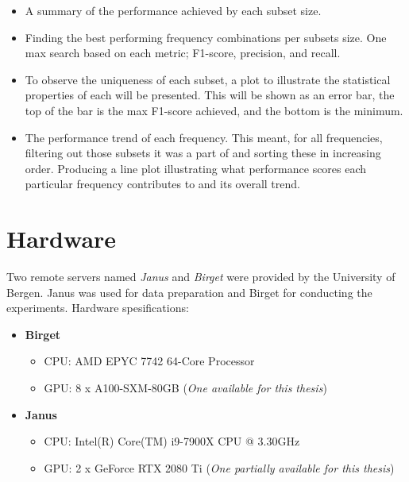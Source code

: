         
        \begin{itemize}
            \item A summary of the performance achieved by each subset size.
            \item Finding the best performing frequency combinations per subsets size. One max search based on each metric; F1-score, precision, and recall.
            \item To observe the uniqueness of each subset, a plot to illustrate the statistical properties of each will be presented. This will be shown as an error bar, the top of the bar is the max F1-score achieved, and the bottom is the minimum. %
            \item The performance trend of each frequency. This meant, for all frequencies, filtering out those subsets it was a part of and sorting these in increasing order. Producing a line plot illustrating what performance scores each particular frequency contributes to and its overall trend.
        \end{itemize}
    


\section{Hardware} \label{hardware}
    Two remote servers named \textit{Janus} and \textit{Birget} were provided by the University of Bergen. Janus was used for data preparation and Birget for conducting the experiments. Hardware spesifications: 
\begin{itemize}
  \item \textbf{Birget}
  \begin{itemize}
    \item CPU: AMD EPYC 7742 64-Core Processor
    \item GPU: 8 x A100-SXM-80GB (\textit{One available for this thesis})
  \end{itemize}
  \item \textbf{Janus}
  \begin{itemize}
    \item CPU: Intel(R) Core(TM) i9-7900X CPU @ 3.30GHz
    \item GPU: 2 x GeForce RTX 2080 Ti (\textit{One partially available for this thesis})
  \end{itemize}
\end{itemize}